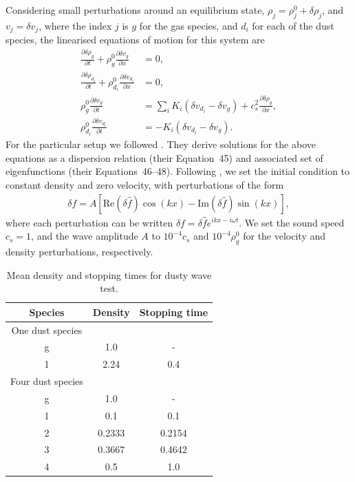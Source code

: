 \documentclass[fleqn,usenatbib]{mnras}
\begin{document}
Considering small perturbations around an equilibrium state, \(\rho_j = \rho_j^0
+ \delta \rho_j\), and \(v_j = \delta v_j\), where the index \(j\) is \(g\) for
the gas species, and \(d_i\) for each of the dust species, the linearised
equations of motion for this system are
%
\begin{align}
   \frac{\partial \delta \rho_g}{\partial t}
      + \rho_g^0 \frac{\partial \delta v_g}{\partial x} &= 0, \\
   \frac{\partial \delta \rho_{d_i}}{\partial t}
      + \rho_{d_i}^0 \frac{\partial \delta v_{d_i}}{\partial x} &= 0, \\
   \rho_g^0 \frac{\partial \delta v_g}{\partial t}
      &= \sum_i K_i \left(\delta v_{d_i} - \delta v_g \right)
         + c_s^2 \frac{\partial \delta \rho_g}{\partial x}, \\
   \rho_{d_i}^0 \frac{\partial \delta v_{d_i}}{\partial t}
      &= - K_i \left(\delta v_{d_i} - \delta v_{g}\right).
\end{align}
%
For the particular setup we followed \citet{Benitez-Llambay2019ApJS..241...25B}.
They derive solutions for the above equations as a dispersion relation (their
Equation~45) and associated set of eigenfunctions (their Equations~46--48).
Following \citet{Benitez-Llambay2019ApJS..241...25B}, we set the initial
condition to constant density and zero velocity, with perturbations of the form
%
\begin{align}
   \delta f = A \left[\mathrm{Re} \left(\delta \hat{f} \right) \cos(kx)
      - \mathrm{Im} \left(\delta \hat{f} \right) \sin(kx) \right],
\end{align}
%
where each perturbation can be written \(\delta f = \delta \hat{f} e^{ikx -
i\omega t}\). We set the sound speed \(c_s = 1\), and the wave amplitude \(A\)
to \(10^{-4} c_s\) and \(10^{-4} \rho_g^0\) for the velocity and density
perturbations, respectively.

\begin{table}
   \centering
   \begin{tabular}{ccc}
      \hline
      \hline
      Species & Density & Stopping time \\
      \hline
      \hline
      One dust species \\
      g & 1.0 & - \\
      1 & 2.24 & 0.4 \\
      \hline
      Four dust species \\
      g & 1.0 & - \\
      1 & 0.1 & 0.1 \\
      2 & 0.2333 & 0.2154 \\
      3 & 0.3667 & 0.4642 \\
      4 & 0.5 & 1.0 \\
      \hline
      \hline
   \end{tabular}
   \caption{Mean density and stopping times for dusty wave test.}%
   \label{tab:wave}
\end{table}
\end{document}
